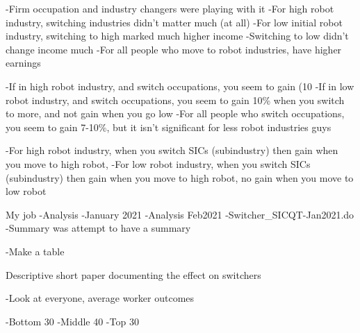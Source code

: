 -Firm occupation and industry changers were playing with it
-For high robot industry, switching industries didn't matter much (at all)
-For low initial robot industry, switching to high marked much higher income
	-Switching to low didn't change income much
-For all people who move to robot industries, have higher earnings

-If in high robot industry, and switch occupations, you seem to gain (10%
-If in low robot industry, and switch occupations, you seem to gain 10\% when you switch to more, and not gain when you go low
-For all people who switch occupations, you seem to gain 7-10\%, but it isn't significant for less robot industries guys

-For high robot industry, when you switch SICs (subindustry) then gain when you move to high robot, 
-For low robot industry, when you switch SICs (subindustry) then gain when you move to high robot, no gain when you move to low robot


My job
	-Analysis
		-January 2021
			-Analysis Feb2021
			-Switcher_SICQT-Jan2021.do
			-Summary was attempt to have a summary

	
	-Make a table 


Descriptive short paper documenting the effect on switchers 

-Look at everyone, average worker outcomes

-Bottom 30%
-Middle 40%
-Top 30%